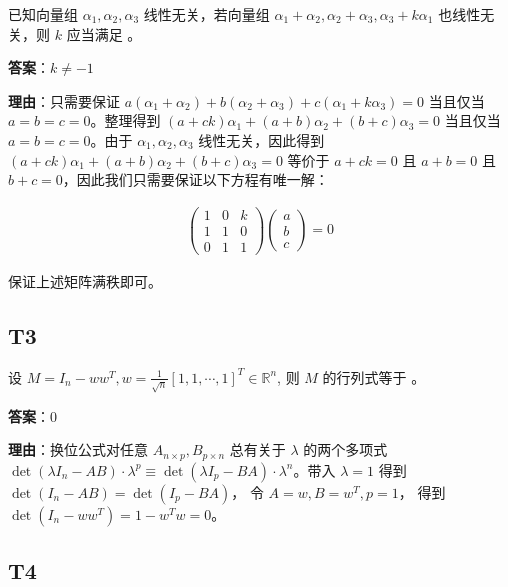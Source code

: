 \documentclass{article}
\begin{document}
\par 已知向量组 $\alpha_1, \alpha_2, \alpha_3$ 线性无关，若向量组 $\alpha_1+\alpha_2, \alpha_2+\alpha_3, \alpha_3+k\alpha_1$ 也线性无关，则 $k$ 应当满足 \underline{\phantom{empty\_space}}。

\par \textbf{答案}：$k\neq -1$

\par \textbf{理由}：只需要保证 $a(\alpha_1+\alpha_2) + b(\alpha_2+\alpha_3)+c(\alpha_1+k\alpha_3)=0$ 当且仅当 $a=b=c=0$。整理得到 $(a+ck)\alpha_1 + (a+b)\alpha_2 + (b+c)\alpha_3=0$ 当且仅当 $a=b=c=0$。由于 $\alpha_1, \alpha_2, \alpha_3$ 线性无关，因此得到 $(a+ck)\alpha_1 + (a+b)\alpha_2 + (b+c)\alpha_3=0$ 等价于 $a+ck=0$ 且 $a+b=0$ 且 $b+c=0$，因此我们只需要保证以下方程有唯一解：

\begin{align*}
	\begin{pmatrix}
		1 & 0 & k\\
		1 & 1 & 0\\
		0 & 1 & 1
	\end{pmatrix} \begin{pmatrix}
		a\\b\\c
	\end{pmatrix}=0
\end{align*}

保证上述矩阵满秩即可。

\subsection{T3}

\par 设 $M=I_n - ww^T, w=\frac{1}{\sqrt n}[ 1, 1, \cdots, 1]^T \in \mathbb R^n$, 则 $M$ 的行列式等于 \underline{\phantom{empty\_space}}。

\par \textbf{答案}：0

\par \textbf{理由}：换位公式对任意 $A_{n\times p}, B_{p\times n}$ 总有关于 $\lambda$ 的两个多项式 $\det(\lambda I_n - AB) \cdot \lambda^p \equiv \det(\lambda I_p - BA) \cdot \lambda^n $。带入 $\lambda = 1$ 得到 $\det(I_n - AB) = \det(I_p - BA)$， 令 $A=w, B=w^T, p=1$， 得到 $\det(I_n - ww^T)=1 - w^Tw=0$。

\subsection{T4}
\end{document}

